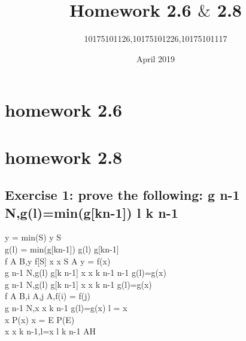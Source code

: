 \documentclass[11pt,a4paper,fleqn]{article}
\title{Homework 2.6 $\&$ 2.8}
\author{10175101126,10175101226,10175101117}
\date{April 2019}
\begin{document}
\maketitle

\section{ homework 2.6 }

\section{homework 2.8}

\subsection{Exercise 1: prove the following:  g  \upto n-1 \rightarrow N,g(l)=min(g[k\upto n-1]) \vdash l \in k \upto n-1} 
\noindent
y = min(S) \vdash y \in S \\
g(l) = min(g[k\upto n-1]) \vdash g(l) \in g[k\upto n-1] \\
f \in A \rightarrow B,y \in f[S] \vdash \exists x \cdot x \in S \cap A \wedge y = f(x) \\
g  \upto n-1 \rightarrow N,g(l) \in g[k \upto n-1] \vdash \exists x \cdot x \in k \upto n-1  \upto n-1 \wedge g(l)=g(x) \\
g  \upto n-1 \rightarrow N,g(l) \in g[k \upto n-1] \vdash \exists x \cdot x \in k \upto n-1 \wedge g(l)=g(x) \\
f \in A \rightarrowtail B,i \in A,j \in A,f(i) = f(j) \\
g  \upto n-1 \rightarrowtail N,\exists x \cdot x \in k \upto n-1 \wedge g(l)=g(x) \vdash l = x \\
\exists x \cdot P(x) \wedge x = E \vdash P(E) \\
\exists x \cdot x \in k \upto n-1,l=x \vdash l \in k \upto n-1 \; AH \\
\end{document}
